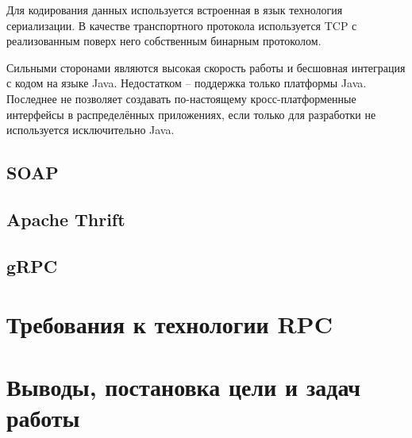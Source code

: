 Для кодирования данных используется встроенная в язык технология сериализации.
В качестве транспортного протокола используется TCP с реализованным
поверх него собственным бинарным протоколом.

Сильными сторонами являются высокая скорость работы и бесшовная интеграция
с кодом на языке Java. Недостатком -- поддержка только платформы Java.
Последнее не позволяет создавать по-настоящему кросс-платформенные интерфейсы
в распределённых приложениях, если только для разработки не используется
исключительно Java.

\subsection{SOAP}
\subsection{Apache Thrift}
\subsection{gRPC}

\section{Требования к технологии RPC}

\section{Выводы, постановка цели и задач работы}
